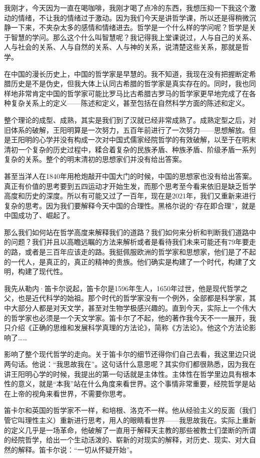 \documentclass[UTF8, 12pt, a4paper]{ctexrep}
\begin{document}
我刚才，今天因为一直在喝咖啡，我刚才喝了点冷的东西，我想压抑一下我这个激动的情绪，不让我的情绪过于激动。因为我们今天是讲哲学课，所以还是得稍微沉静一下来，不夹杂太多的感情和情绪进去。哲学是一个什么样的学问呢？哲学是关于智慧的学问。那么这个什么叫智慧呢？我记得我上堂课说过，人与自己的关系、人与社会的关系、人与自然的关系、人与神的关系，说清楚这些关系，那就是哲学。

在中国的漫长历史上，中国的哲学家是早慧的。我不知道，我现在没有把握断定希腊历史是不是伪史，但我大体上认同古希腊的哲学家是真实存在的。同时，我也同样地非常肯定中国的哲学家可能比罗马比古希腊古罗马的哲学家更早地完成了在各种复杂关系上的定义——陈述和定义，甚至包括在自然科学方面的陈述和定义。

整个理论的成型、成熟，其实是我们到了汉就已经非常成熟了。成熟定型之后，对旧体系的破解，王阳明算是一次努力，五百年前进行了一次努力——思想解放。但是王阳明的心学并没有构成一次对中国式儒家经院哲学的有效破解，以至于在明末清初一个复杂的历史过程中，糅合着复杂的民族矛盾、种族矛盾、阶级矛盾一系列复杂的关系。整个的明末清初的思想家们并没有给出答案。

甚至当洋人在1840年用枪炮敲开中国大门的时候，中国的思想家也没有给出答案。真正有价值的思考要到五四运动才开始生发，而那个思考至今看来依旧是缺乏哲学高度和历史的深度。所以有可能又过了一百年，现在是2021年，我们又重新来进行复杂的思考。因为我们要解释今天中国的合理性。黑格尔说的“存在即合理”，就是中国成功了、崛起了。

那么我们如何站在哲学高度来解释我们的道路？我们如何来分析和判断我们道路中的问题？我们并且以高瞻远瞩的方法来解析或者是看待我们未来可能还有79年要走的路，或者是三百年应该走的路。我挺佩服欧洲的哲学家和思想家，他们是了不起的一代人，是真正的，真正的精神的贵族。他们确实是构建了一个时代，构建了文明，构建了现代性。

我先从勒内·笛卡尔说起，笛卡尔是1596年生人，1650年过世，他是现代哲学之父，也是近代科学的始祖。那个时代的哲学家没有一个例外，全部都是科学家，其中大部分人都是对天文学，甚至对生物学极感兴趣的。直到今天，实际上一个伟大的哲学家也必须是一个天文学家。笛卡尔了不起，他的著作我今天不一一展开，我只介绍《正确的思维和发展科学真理的方法论》，简称《方法论》。他这个方法论影响了……

影响了整个现代哲学的走向。关于笛卡尔的细节还得你们自己去看，我这里边只说两句话。他说：“我思故我在”。这句话什么意思呢？其实你们都很熟悉，因为我在讲王阳明心学的时候，我提出的第一句话就是主体性。主体性在哲学里边具有根本性的意义，就是“本我”站在什么角度来看世界。这个事情非常重要，经院哲学是站在上帝的视角来看世界，不需要你思考。

笛卡尔和英国的哲学家不一样，和培根、洛克不一样。他从经验主义的反面（我们管它叫理性主义）重新进行思考，用人的眼睛看世界——我思故我在。实际上重新的定义几乎是一场革命，他破解了一直用于解释天主教的那些被教士们垄断的所谓的经院哲学，给出一个生动活泼的、崭新的对现实的解释，对历史、现实、对大自然的解释。笛卡尔说：“一切从怀疑开始”。
\end{document}
